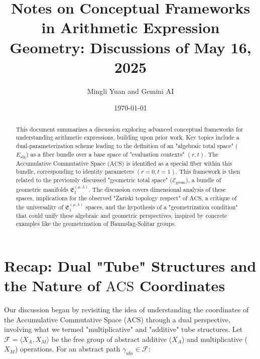 \documentclass{article}[a4paper,12pt]
\title{Notes on Conceptual Frameworks in Arithmetic Expression Geometry: Discussions of May 16, 2025}
\author{Mingli Yuan and Gemini AI}
\date{\today}
\begin{document}
\maketitle
\begin{abstract}
This document summarizes a discussion exploring advanced conceptual frameworks for understanding arithmetic expressions, building upon prior work. Key topics include a dual-parameterization scheme leading to the definition of an "algebraic total space" ($E_{\text{alg}}$) as a fiber bundle over a base space of "evaluation contexts" $(r,t)$. The Accumulative Commutative Space ($\mathrm{ACS}$) is identified as a special fiber within this bundle, corresponding to identity parameters $(r=0, t=1)$. This framework is then related to the previously discussed "geometric total space" ($\mathcal{E}_{\text{geom}}$), a bundle of geometric manifolds $\mathfrak{E}_1^{(\mu,\lambda)}$. The discussion covers dimensional analysis of these spaces, implications for the observed "Zariski topology respect" of $\mathrm{ACS}$, a critique of the universality of $\mathfrak{E}_1^{(\mu,\lambda)}$ spaces, and the hypothesis of a "geometrization condition" that could unify these algebraic and geometric perspectives, inspired by concrete examples like the geometrization of Baumslag-Solitar groups.
\end{abstract}

\tableofcontents

\section{Recap: Dual "Tube" Structures and the Nature of $\mathrm{ACS}$ Coordinates}

Our discussion began by revisiting the idea of understanding the coordinates of the Accumulative Commutative Space ($\mathrm{ACS}$) through a dual perspective, involving what we termed "multiplicative" and "additive" tube structures. Let $\mathcal{F} = \langle X_A, X_M \rangle$ be the free group of abstract additive ($X_A$) and multiplicative ($X_M$) operations. For an abstract path $\gamma_{abs} \in \mathcal{F}$:
\end{document}
